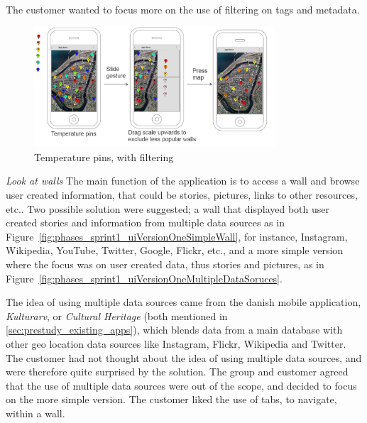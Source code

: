 \documentclass[11pt]{book}
\begin{document}
The customer wanted to focus more on the use of filtering on tags and metadata.

\begin{figure}[H]
    \centering
    \includegraphics[width=0.8\textwidth]{Figures/Phases/Sprint1/versiononeTempPings.png}
    \caption{Temperature pins, with filtering}
    \label{fig:phases_sprint1_uiVersionOneTempPings}
\end{figure}

\textit{Look at walls}
The main function of the application is to access a wall and browse user created information, that could be stories, pictures, links to other resources, etc.. Two possible solution were suggested; a wall that displayed both user created stories and information from multiple data sources as in Figure~\ref{fig:phases_sprint1_uiVersionOneSimpleWall}, for instance, Instagram, Wikipedia, YouTube, Twitter, Google, Flickr, etc., and a more simple version where the focus was on user created data, thus stories and pictures, as in Figure~\ref{fig:phases_sprint1_uiVersionOneMultipleDataSoruces}.

The idea of using multiple data sources came from the danish mobile application, \emph{Kulturarv}, or \emph{Cultural Heritage} (both mentioned in \ref{sec:prestudy_existing_apps}), which blends data from a main database with other geo location data sources like Instagram, Flickr, Wikipedia and Twitter. The customer had not thought about the idea of using multiple data sources, and were therefore quite surprised by the solution. The group and customer agreed that the use of multiple data sources were out of the scope, and decided to focus on the more simple version. The customer liked the use of tabs, to navigate, within a wall.
\end{document}
